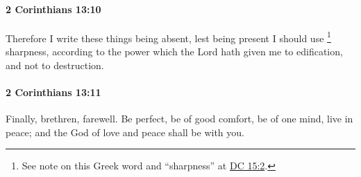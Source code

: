 		\paragraph{2 Corinthians 13:10} %
			\label{2CORINTHIANS-13-10}

			Therefore I write these things being absent, lest being present I should use
			\footnote{%
				See note on this Greek word and ``sharpness'' at \hyperref[DC15-2]{DC 15:2}.
				}%
			sharpness, according to the power which the Lord hath given me to edification, and not to destruction.

			\begin{framed}
			\scriptsize
				\begin{compactdesc}
					\item[SBLG] 
				\end{compactdesc}
			\end{framed}

		\paragraph{2 Corinthians 13:11} %
			\label{2CORINTHIANS-13-11}

			Finally, brethren, farewell.  Be perfect, be of good comfort, be of one mind, live in peace; and the God of love and peace shall be with you.

